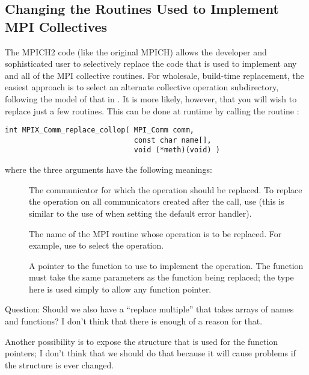 \subsection{Changing the Routines Used to Implement MPI Collectives}

The MPICH2 code (like the original MPICH) allows the developer and
sophisticated user to selectively replace the code that is used to
implement any and all of the MPI collective routines.  For wholesale,
build-time replacement, the easiest approach is to select an alternate
collective operation subdirectory, following the model of that in
.  It is more likely, however, that you will wish
to replace just a few routines.  This can be done at runtime by
calling the routine :

\begin{verbatim}
int MPIX_Comm_replace_collop( MPI_Comm comm, 
                              const char name[],
                              void (*meth)(void) )
\end{verbatim}
where the three arguments have the following meanings:
\begin{description}
\item[]The communicator for which the operation should be
  replaced.  To replace the operation on all communicators created
  after the call, use  (this is similar to the use
  of  when setting the default error handler).
\item[]The name of the MPI routine whose operation is to be
  replaced.  For example, use  to select the
   operation.
\item[]A pointer to the function to use to implement the
  operation.  The function must take the same parameters as the
  function being replaced; the  type here is used
  simply to allow any function pointer.
\end{description}

Question:  Should we also have a ``replace multiple'' that takes
arrays of names and functions?  I don't think that there is enough of
a reason for that.  

Another possibility is to expose the structure that is used for the
function pointers; I don't think that we should do that because it
will cause problems if the structure is ever changed.

